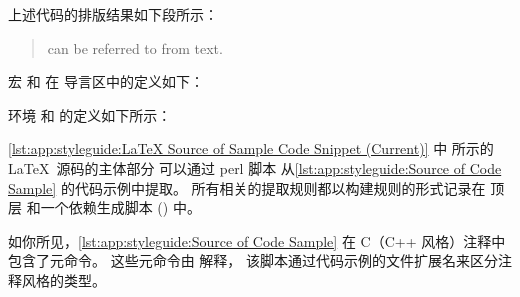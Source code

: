 上述代码的排版结果如下段所示：

\begin{quote}
\begin{fcvref}[ln:base1]
 can be referred
to from text.
\end{fcvref}
\end{quote}

宏 \qco{\\lnlbl\{\}} 和 \qco{\\lnref\{\}} 在
导言区中的定义如下：

\begin{VerbatimU}
\newcommand{\lnlblbase}{}
\newcommand{\lnlbl}[1]{%
  \phantomsection\label{\lnlblbase:#1}}
\newcommand{\lnrefbase}{}
\newcommand{\lnref}[1]{\ref{\lnrefbase:#1}}
\end{VerbatimU}

环境  和  的定义如下所示：

\begin{VerbatimU}
\newenvironment{fcvlabel}[1][]{%
  \renewcommand{\lnlblbase}{#1}%
  \ignorespaces}{\ignorespacesafterend}
\newenvironment{fcvref}[1][]{%
  \renewcommand{\lnrefbase}{#1}%
  \ignorespaces}{\ignorespacesafterend}
\end{VerbatimU}

\begin{fcvref}
\cref{lst:app:styleguide:LaTeX Source of Sample Code Snippet (Current)}
中 所示的\LaTeX\ 源码的主体部分
可以通过 perl 脚本 
从\cref{lst:app:styleguide:Source of Code Sample} 的代码示例中提取。
所有相关的提取规则都以构建规则的形式记录在
顶层  和一个依赖生成脚本
() 中。
\end{fcvref}

\begin{listing*}
\vspace*{-9pt}
\caption{带 ``snippet'' 元命令的代码示例源码}
\label{lst:app:styleguide:Source of Code Sample}
\end{listing*}

如你所见，\cref{lst:app:styleguide:Source of Code Sample}
在 C（C++ 风格）注释中包含了元命令。
这些元命令由  解释，
该脚本通过代码示例的文件扩展名来区分注释风格的类型。

